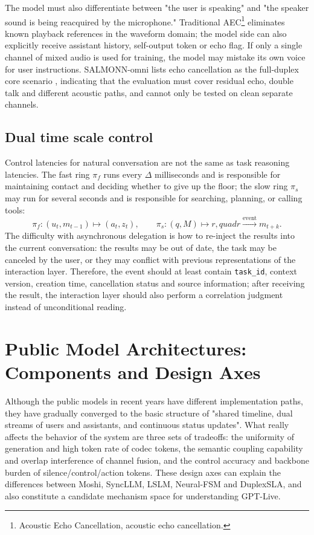 \documentclass[UTF8,fontset=none,a4paper,10pt]{ctexart}
\begin{document}
The model must also differentiate between "the user is speaking" and "the speaker sound is being reacquired by the microphone." Traditional AEC\footnote{Acoustic Echo Cancellation, acoustic echo cancellation. } eliminates known playback references in the waveform domain; the model side can also explicitly receive assistant history, self-output token or echo flag. If only a single channel of mixed audio is used for training, the model may mistake its own voice for user instructions. SALMONN-omni lists echo cancellation as the full-duplex core scenario \cite{en:yu2025salmonnomni}, indicating that the evaluation must cover residual echo, double talk and different acoustic paths, and cannot only be tested on clean separate channels.

\subsection{Dual time scale control}

Control latencies for natural conversation are not the same as task reasoning latencies. The fast ring $\pi_f$ runs every $\Delta$ milliseconds and is responsible for maintaining contact and deciding whether to give up the floor; the slow ring $\pi_s$ may run for several seconds and is responsible for searching, planning, or calling tools:
\begin{equation}
\pi_f:(u_t,m_{t-1})\mapsto(a_t,z_t),\qquad
\pi_s:(q,M)\mapsto r,quad r\xrightarrow{\mathrm{event}}m_{t+k}.
\end{equation}
The difficulty with asynchronous delegation is how to re-inject the results into the current conversation: the results may be out of date, the task may be canceled by the user, or they may conflict with previous representations of the interaction layer. Therefore, the event should at least contain \texttt{task\_id}, context version, creation time, cancellation status and source information; after receiving the result, the interaction layer should also perform a correlation judgment instead of unconditional reading.

\section{Public Model Architectures: Components and Design Axes}

Although the public models in recent years have different implementation paths, they have gradually converged to the basic structure of "shared timeline, dual streams of users and assistants, and continuous status updates". What really affects the behavior of the system are three sets of tradeoffs: the uniformity of generation and high token rate of codec tokens, the semantic coupling capability and overlap interference of channel fusion, and the control accuracy and backbone burden of silence/control/action tokens. These design axes can explain the differences between Moshi, SyncLLM, LSLM, Neural-FSM and DuplexSLA, and also constitute a candidate mechanism space for understanding GPT-Live.
\end{document}

